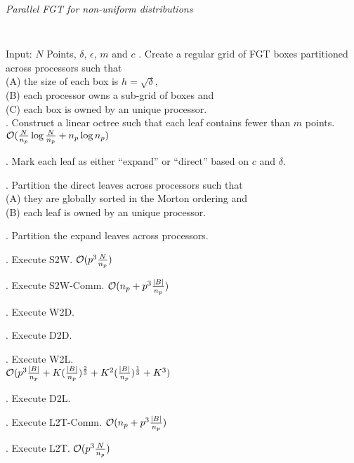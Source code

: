 \begin{algorithm}[!h]
\caption{ \label{a:ofgt}
\em Parallel FGT for non-uniform distributions}
{\tt
\begin{algorithmic}
\STATE Input: $N$ Points, $\delta$, $\epsilon$, $m$ and $c$
. Create a regular grid of FGT boxes partitioned across processors such that \\
 (A) the size of each box is $h = \sqrt{\delta}$, \\
 (B) each processor owns a sub-grid of boxes and \\
 (C) each box is owned by an unique processor. \\

. Construct a linear octree such that each leaf contains fewer than $m$ points. \\
\hfill $\mathcal{O}(\frac{N}{n_p} \log{\frac{N}{n_p}} + n_p \log{n_p})$

. Mark each leaf as either ``expand'' or ``direct'' based on $c$ and $\delta$.

. Partition the direct leaves across processors such that \\
  (A) they are globally sorted in the Morton ordering and \\
  (B) each leaf is owned by an unique processor.

. Partition the expand leaves across processors. 

. Execute S2W. \hfill $\mathcal{O}(p^3 \frac{N}{n_p})$

. Execute S2W-Comm. \hfill $\mathcal{O}(n_p + p^3\frac{|B|}{n_p})$

. Execute W2D. 

. Execute D2D. 

. Execute W2L. \\
 \hfill $\mathcal{O}(p^3 \frac{|B|}{n_p} + K (\frac{|B|}{n_p})^{\frac{2}{3}} + K^2(\frac{|B|}{n_p})^{\frac{1}{3}} + K^3 )$ 

. Execute D2L. 

. Execute L2T-Comm. \hfill $\mathcal{O}(n_p + p^3\frac{|B|}{n_p})$ 

. Execute L2T. \hfill $\mathcal{O}( p^3\frac{N}{n_p})$
\end{algorithmic}
}
\end{algorithm}


